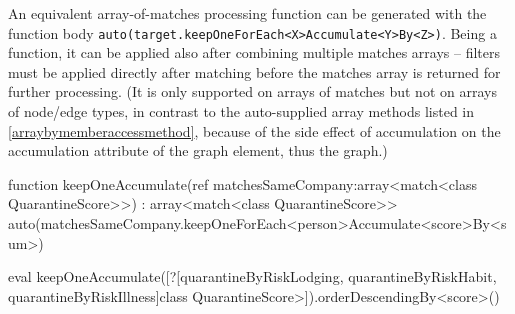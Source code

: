 An equivalent array-of-matches processing function can be generated with the function body \texttt{auto(target.keepOneForEach<X>Accumulate<Y>By<Z>)}.
Being a function, it can be applied also after combining multiple matches arrays -- filters must be applied directly after matching before the matches array is returned for further processing.
(It is only supported on arrays of matches but not on arrays of node/edge types, in contrast to the auto-supplied array methods listed in \ref{arraybymemberaccessmethod}, because of the side effect of accumulation on the accumulation attribute of the graph element, thus the graph.)

\begin{example}
  \begin{grgen}
function keepOneAccumulate(ref matchesSameCompany:array<match<class QuarantineScore>>) : array<match<class QuarantineScore>>
{
	auto(matchesSameCompany.keepOneForEach<person>Accumulate<score>By<sum>)
}
  \end{grgen}\label{exkeeponeforeachaccumulateby}

	\begin{grshell}
	eval keepOneAccumulate([?[quarantineByRiskLodging, quarantineByRiskHabit, quarantineByRiskIllness]\<class QuarantineScore>]).orderDescendingBy<score>()
	\end{grshell}
\end{example}
